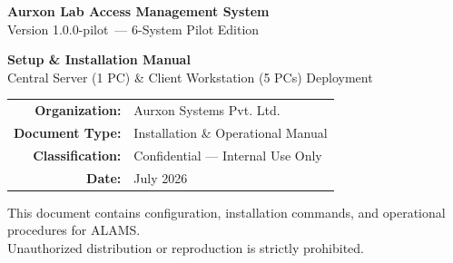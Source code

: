 \documentclass[12pt, a4paper]{report}
\newcommand{\alamsversion}{1.0.0-pilot}
\begin{document}
\begin{titlepage}
\pagecolor{aurxondark}
\color{white}
\begin{center}
\vspace*{3cm}


\vspace{1.5cm}
{\fontsize{26}{30}\selectfont\textbf{Aurxon Lab Access Management System}}\\[0.5cm]
{\large\color{aurxongray} Version \alamsversion\ — 6-System Pilot Edition}\\[2cm]


\vspace{1cm}
{\LARGE\textbf{Setup \& Installation Manual}}\\[0.4cm]
{\normalsize\color{aurxongray} Central Server (1 PC) \& Client Workstation (5 PCs) Deployment}

\vfill

\begin{tabular}{rl}
  \textbf{Organization:} & Aurxon Systems Pvt. Ltd.\\
  \textbf{Document Type:} & Installation \& Operational Manual\\
  \textbf{Classification:} & \textcolor{aurxonamber}{Confidential — Internal Use Only}\\
  \textbf{Date:} & July 2026\\
\end{tabular}

\vspace{1.5cm}
\small\color{aurxongray}
This document contains configuration, installation commands, and operational procedures for ALAMS.\\
Unauthorized distribution or reproduction is strictly prohibited.
\end{center}
\end{titlepage}

\nopagecolor
\color{black}
\end{document}
